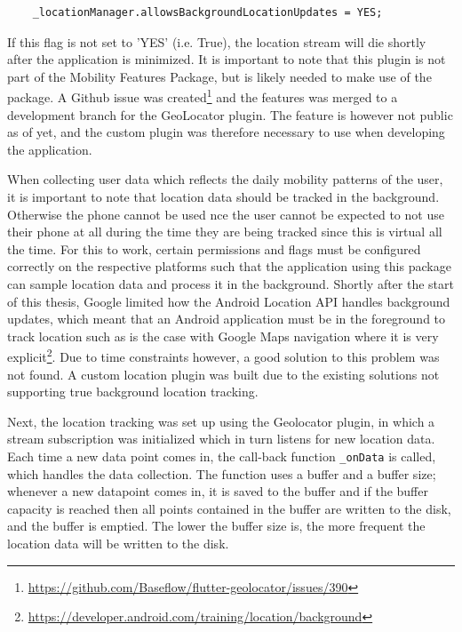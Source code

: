 \begin{verbatim}
    _locationManager.allowsBackgroundLocationUpdates = YES;
\end{verbatim}

If this flag is not set to 'YES' (i.e. True), the location stream will die shortly after the application is minimized. It is important to note that this plugin is not part of the Mobility Features Package, but is likely needed to make use of the package. A Github issue was created\footnote{\url{https://github.com/Baseflow/flutter-geolocator/issues/390}} and the features was merged to a development branch for the GeoLocator plugin. The feature is however not public as of yet, and the custom plugin was therefore necessary to use when developing the application. 

When collecting user data which reflects the daily mobility patterns of the user, it is important to note that location data should be tracked in the background. Otherwise the phone cannot be used nce the user cannot be expected to not use their phone at all during the time they are being tracked since this is virtual all the time. For this to work, certain permissions and flags must be configured correctly on the respective platforms such that the application using this package can sample location data and process it in the background. Shortly after the start of this thesis, Google limited how the Android Location API handles background updates, which meant that an Android application must be in the foreground to track location such as is the case with Google Maps navigation where it is very explicit\footnote{\url{https://developer.android.com/training/location/background}}. Due to time constraints however, a good solution to this problem was not found. A custom location plugin was built due to the existing solutions not supporting true background location tracking. 

Next, the location tracking was set up using the Geolocator plugin, in which a stream subscription was initialized which in turn listens for new location data. Each time a new data point comes in, the call-back function \verb|_onData| is called, which handles the data collection. The function uses a buffer and a buffer size; whenever a new datapoint comes in, it is saved to the buffer and if the buffer capacity is reached then all points contained in the buffer are written to the disk, and the buffer is emptied. The lower the buffer size is, the more frequent the location data will be written to the disk.

